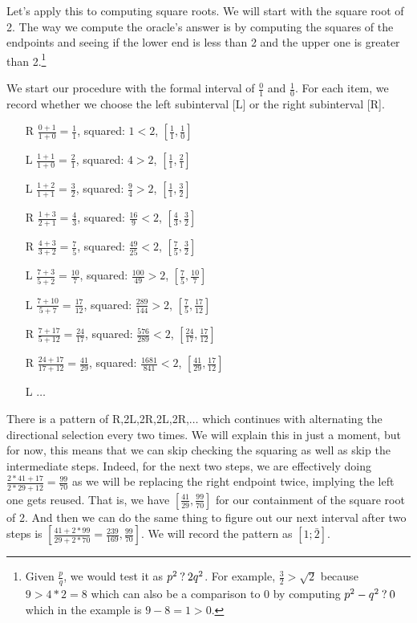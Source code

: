 \documentclass[12pt]{article}
\begin{document}
Let's apply this to computing square roots. We will start with the square root of 2. The way we compute the oracle's answer is by computing the squares of the endpoints and seeing if the lower end is less than 2 and the upper one is greater than 2.\footnote{Given $\frac{p}{q}$, we would test it as $p^2 \mathbin{?} 2q^2$. For example, $\frac{3}{2} > \sqrt{2}$ because $9 > 4*2 = 8$ which can also be a comparison to 0 by computing $p^2 - q^2 \mathbin{?} 0$ which in the example is $9-8=1 > 0$.}

We start our procedure with the formal interval of $\tfrac{0}{1}$ and $\tfrac{1}{0}$. For each item, we record whether we choose the left subinterval [L] or the right subinterval [R]. 


\begin{itemize}
    \item[R] $\tfrac{0+1}{1+0} = \tfrac{1}{1}$, squared: $1 < 2$,  $[\tfrac{1}{1},\tfrac{1}{0}] $
    \item[L] $\tfrac{1+1}{1+0} = \tfrac{2}{1}$, squared: $4 > 2$, $[\tfrac{1}{1},\tfrac{2}{1}]$
    \item[L] $\tfrac{1+2}{1+1} = \tfrac{3}{2}$, squared: $\tfrac{9}{4} > 2$, $[\tfrac{1}{1},\tfrac{3}{2}]$
    \item[R] $\tfrac{1+3}{2+1} = \tfrac{4}{3}$, squared: $\tfrac{16}{9} < 2$, $[\tfrac{4}{3},\tfrac{3}{2}]$
    \item[R] $\tfrac{4+3}{3+2} = \tfrac{7}{5}$, squared: $\tfrac{49}{25} < 2$, 
    $[\tfrac{7}{5},\tfrac{3}{2}]$
    \item[L] $\tfrac{7+3}{5+2} = \tfrac{10}{7}$, squared: $\tfrac{100}{49} > 2$, 
    $[\tfrac{7}{5},\tfrac{10}{7}]$
    \item[L] $\tfrac{7+10}{5+7} = \tfrac{17}{12}$, squared: $\tfrac{289}{144} > 2$, 
    $[\tfrac{7}{5},\tfrac{17}{12}]$
    \item[R] $\tfrac{7+17}{5+12} = \tfrac{24}{17}$, squared: $\tfrac{576}{289} < 2$, 
    $[\tfrac{24}{17},\tfrac{17}{12}]$
    \item[R] $\tfrac{24+17}{17+12} = \tfrac{41}{29}$, squared: $\tfrac{1681}{841} < 2$, 
    $[\tfrac{41}{29},\tfrac{17}{12}]$
    \item[L] $\ldots$
\end{itemize}

There is a pattern of R,2L,2R,2L,2R,$\ldots$ which continues with alternating the directional selection every two times. We will explain this in just a moment, but for now, this means that we can skip checking the squaring as well as skip the intermediate steps. Indeed, for the next two steps, we are effectively doing $\tfrac{2*41 + 17}{2*29 + 12} = \tfrac{99}{70}$ as we will be replacing the right endpoint twice, implying the left one gets reused. That is, we have $[\tfrac{41}{29}, \tfrac{99}{70}]$ for our containment of the square root of 2. And then we can do the same thing to figure out our next interval after two steps is $[\tfrac{41+2*99}{29+2*70}=\tfrac{239}{169}, \tfrac{99}{70}]$. We will record the pattern as $[1; \bar{2}]$.
\end{document}
